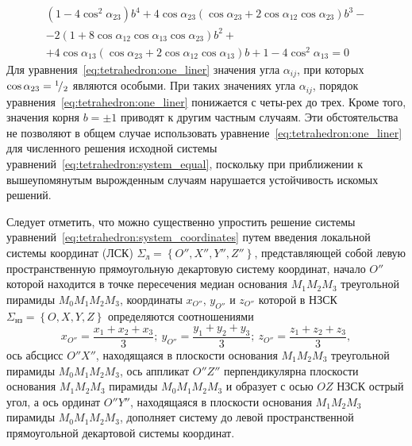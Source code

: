 \documentclass[../main.tex]{subfiles}
\begin{document}
%
%
\begin{equation} \label{eq:tetrahedron:one_liner}
  \begin{gathered}
      \left(1-4 \cos^2 \alpha_{23}\right) b^4 + 4 \cos \alpha_{23} \left(\cos \alpha_{23} + 2 \cos \alpha_{12} \cos \alpha_{23} \right) b^3 - \\
      - 2 \left(1 + 8 \cos \alpha_{12} \cos \alpha_{13} \cos \alpha_{23}\right) b^2 + \\
      + 4 \cos \alpha_{13} \left(\cos \alpha_{23} + 2 \cos \alpha_{12} \cos \alpha_{13}\right) b + 1-4 \cos^2 \alpha_{13} = 0
  \end{gathered}
\end{equation}
Для уравнения~\eqref{eq:tetrahedron:one_liner} значения угла $\alpha_{ij}$, при которых $\cos\alpha_{23} = {}^{1}\!/_{2}$ являются особыми. При таких значениях угла $\alpha_{ij}$, порядок уравнения~\eqref{eq:tetrahedron:one_liner} понижается с четы-рех до трех. Кроме того, значения корня $b = \pm 1$ приводят к другим частным случаям. Эти обстоятельства не позволяют в общем случае использовать уравнение~\eqref{eq:tetrahedron:one_liner} для численного решения исходной системы уравнений~\eqref{eq:tetrahedron:system_equal}, поскольку при приближении к вышеупомянутым вырожденным случаям нарушается устойчивость искомых решений.

Следует отметить, что можно существенно упростить решение системы уравнений~\eqref{eq:tetrahedron:system_coordinates} путем введения локальной системы координат (ЛСК) $\Sigma_{\text{л}} = \left\{O'', X'', Y'', Z''\right\}$, представляющей собой левую пространственную прямоугольную декартовую систему координат, начало $O''$ которой находится в точке пересечения медиан основания $M_1 M_2 M_3$ треугольной пирамиды $M_0 M_1 M_2 M_3$, координаты $x_{O''}$, $y_{O''}$ и $z_{O''}$ которой в НЗСК $\Sigma_{\text{нз}} = \left\{O, X, Y, Z\right\}$ определяются соотношениями
\begin{equation}
  x_{O''} = \frac{x_1 + x_2 + x_3}{3};\
  y_{O''} = \frac{y_1 + y_2 + y_3}{3};\
  z_{O''} = \frac{z_1 + z_2 + z_3}{3},
\end{equation}
ось абсцисс $O''X''$, находящаяся в плоскости основания $M_1 M_2 M_3$ треугольной пирамиды $M_0 M_1 M_2 M_3$, ось аппликат $O''Z''$ перпендикулярна плоскости основания $M_1 M_2 M_3$ пирамиды $M_0 M_1 M_2 M_3$ и образует с осью $OZ$  НЗСК острый угол, а ось ординат $O''Y''$, находящаяся в плоскости основания $M_1 M_2 M_3$ пирамиды $M_0 M_1 M_2 M_3$, дополняет систему до левой пространственной прямоугольной декартовой системы координат.
\end{document}
